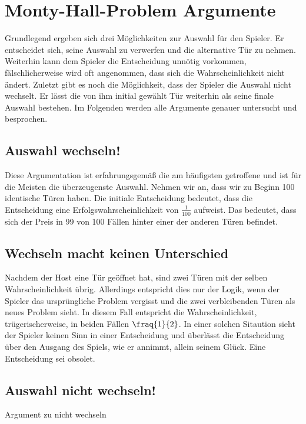 \chapter{Monty-Hall-Problem Argumente}

Grundlegend ergeben sich drei Möglichkeiten zur Auswahl für den Spieler. Er entscheidet sich, seine Auswahl zu verwerfen und die alternative Tür zu nehmen.
Weiterhin kann dem Spieler die Entscheidung unnötig vorkommen, fälschlicherweise wird oft angenommen, dass sich die Wahrscheinlichkeit nicht ändert. Zuletzt gibt es 
noch die Möglichkeit, dass der Spieler die Auswahl nicht wechselt. Er lässt die von ihm initial gewählt Tür weiterhin als seine finale Auswahl bestehen.
Im Folgenden werden alle Argumente genauer untersucht und besprochen.

    \section{Auswahl wechseln!}
    Diese Argumentation ist erfahrungsgemäß die am häufigsten getroffene und ist für die Meisten die überzeugenste Auswahl. Nehmen wir an, dass wir zu Beginn
    100 identische Türen haben. Die initiale Entscheidung bedeutet, dass die Entscheidung eine Erfolgswahrscheinlichkeit von $\frac{1}{100}$ aufweist. Das bedeutet, 
    dass sich der Preis in 99 von 100 Fällen hinter einer der anderen Türen befindet.

    \section{Wechseln macht keinen Unterschied}
    Nachdem der Host eine Tür geöffnet hat, sind zwei Türen mit der selben Wahrscheinlichkeit übrig. Allerdings entspricht dies nur der Logik, wenn der Spieler das 
    ursprüngliche Problem vergisst und die zwei verbleibenden Türen als neues Problem sieht. In diesem Fall entspricht die Wahrscheinlichkeit, trügerischerweise, in
    beiden Fällen $\fraq{1}{2}$. In einer solchen Sitaution sieht der Spieler keinen Sinn in einer Entscheidung und überlässt die Entscheidung über den Ausgang 
    des Spiels, wie er annimmt, allein seinem Glück. Eine Entscheidung sei obsolet.


    \section{Auswahl nicht wechseln!}
    Argument zu nicht wechseln